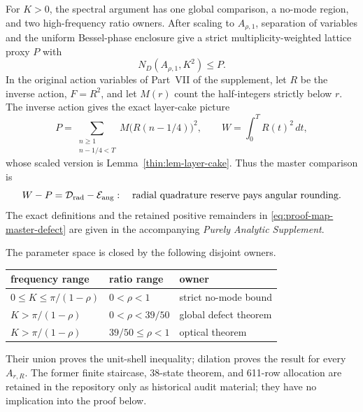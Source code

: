 \documentclass[11pt]{article}
\numberwithin{equation}{section}
\theoremstyle{definition}
\theoremstyle{remark}
\begin{document}
For \(K>0\), the spectral argument has one global comparison, a no-mode
region, and two high-frequency ratio owners.  After scaling to
\(A_{\rho,1}\), separation of variables and the uniform Bessel-phase
enclosure give a strict multiplicity-weighted lattice proxy \(P\) with
\[
 N_D(A_{\rho,1},K^2)\leq P.
\]
In the original action variables of Part~VII of the supplement, let \(R\) be
the inverse action, \(F=R^2\), and let \(M(r)\) count the half-integers
strictly below \(r\).  The inverse action gives the exact layer-cake picture
\[
 P=\sum_{\substack{n\geq1\\n-1/4<T}}M\bigl(R(n-1/4)\bigr)^2,
 \qquad
 W=\int_0^T R(t)^2\,dt,
\]
whose scaled version is Lemma~\ref{thin:lem-layer-cake}.  Thus the master
comparison is
\begin{equation}
 W-P=\mathcal D_{\rm rad}-\mathcal E_{\rm ang}:
 \quad\hbox{radial quadrature reserve pays angular rounding.}
 \label{eq:proof-map-master-defect}
\end{equation}
The exact definitions and the retained positive remainders in
\eqref{eq:proof-map-master-defect} are given in the accompanying
\emph{Purely Analytic Supplement}.

\begin{samepage}
The parameter space is closed by the following disjoint owners.
\begin{center}
\begin{tabular}{@{}lll@{}}
\toprule
frequency range&ratio range&owner\\
\midrule
\(0\leq K\leq\pi/(1-\rho)\)&\(0<\rho<1\)&strict no-mode bound\\
\(K>\pi/(1-\rho)\)&\(0<\rho<39/50\)&global defect theorem\\
\(K>\pi/(1-\rho)\)&\(39/50\leq\rho<1\)&optical theorem\\
\bottomrule
\end{tabular}
\end{center}
\end{samepage}
Their union proves the unit-shell inequality; dilation proves the result for
every \(A_{r,R}\).  The former finite staircase, 38-state theorem, and
611-row allocation are retained in the repository only as historical audit
material; they have no implication into the proof below.

\end{document}
